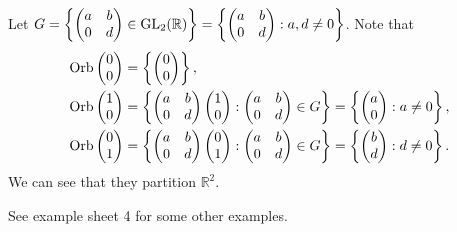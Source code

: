 \documentclass[10pt]{article}
\def\d{{\mathrm d}}
\begin{document}
    \begin{example}
        Let $ G = \left\{ \begin{pmatrix} a&b\\0&d \end{pmatrix}\in \mathrm{GL}_2({\mathbb{R}}) \right\}=\left\{ \begin{pmatrix} a&b\\0&d \end{pmatrix}:a,d\neq 0 \right\} $. Note that 
        \begin{align*}
            \operatorname{Orb}\begin{pmatrix}
                0\\0
            \end{pmatrix}&=\left\{ \begin{pmatrix}
                0\\0
            \end{pmatrix} \right\},\\
            \operatorname{Orb} \begin{pmatrix}
                1\\0
            \end{pmatrix}&=\left\{ \begin{pmatrix} a&b\\0&d \end{pmatrix}\begin{pmatrix}
                1\\0
            \end{pmatrix}:\begin{pmatrix} a&b\\0&d \end{pmatrix}\in G \right\} = \left\{ \begin{pmatrix}
                a\\0
            \end{pmatrix}:a\neq 0 \right\},\\
            \operatorname{Orb}\begin{pmatrix}
                0\\1
            \end{pmatrix}&=\left\{ \begin{pmatrix} a&b\\0&d \end{pmatrix}\begin{pmatrix}
                0\\1
            \end{pmatrix}:\begin{pmatrix} a&b\\0&d \end{pmatrix}\in G \right\} = \left\{ \begin{pmatrix}
                b\\d
            \end{pmatrix}:d\neq 0 \right\}.
        \end{align*}
        We can see that they partition $ \mathbb{R}^{2} $.
    \end{example}
    See example sheet 4 for some other examples.
\end{document}
